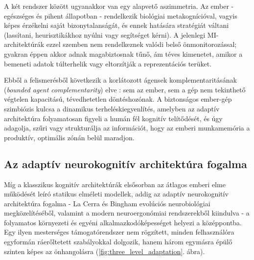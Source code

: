 \documentclass[12pt,a4paper,oneside]{book}
\begin{document}
A két rendszer között ugyanakkor van egy alapvető aszimmetria. Az ember - egészséges és pihent állapotban - rendelkezik biológiai metakognícióval, vagyis képes érzékelni saját bizonytalanságát, és ennek hatására stratégiát váltani (lassítani, heurisztikákhoz nyúlni vagy segítséget kérni). A jelenlegi MI-architektúrák ezzel szemben nem rendelkeznek valódi belső önmonitorozással; gyakran éppen akkor adnak magabiztosnak tűnő, ám téves kimenetet, amikor a bemeneti adatok túlterhelik vagy eltorzítják a reprezentációs terüket. 

Ebből a felismerésből következik a korlátozott ágensek komplementaritásának (\emph{bounded agent complementarity}) elve \cite{wang2026}: sem az ember, sem a gép nem tekinthető végtelen kapacitású, tévedhetetlen döntéshozónak. A biztonságos ember-gép szimbiózis kulcsa a dinamikus terheléskiegyenlítés, amelyben az adaptív architektúra folyamatosan figyeli a humán fél kognitív telítődését, és úgy adagolja, szűri vagy strukturálja az információt, hogy az emberi munkamemória a produktív, optimális zónán belül maradjon.

\subsection{Az adaptív neurokognitív architektúra fogalma}

Míg a klasszikus kognitív architektúrák elsősorban az átlagos emberi elme működését leíró statikus elméleti modellek, addig az adaptív neurokognitív architektúra fogalma - La Cerra és Bingham \cite{laCerra1998} evolúciós neurobiológiai megközelítéséből, valamint a modern neuroergonómiai rendszerekből kiindulva - a folyamatos környezeti és egyéni alkalmazkodóképességet helyezi a középpontba. Egy ilyen mesterséges támogatórendszer nem rögzített, minden felhasználóra egyformán ráerőltetett szabályokkal dolgozik, hanem három egymásra épülő szinten képes az önhangolásra (\ref{fig:three_level_adaptation}. ábra).
\end{document}
